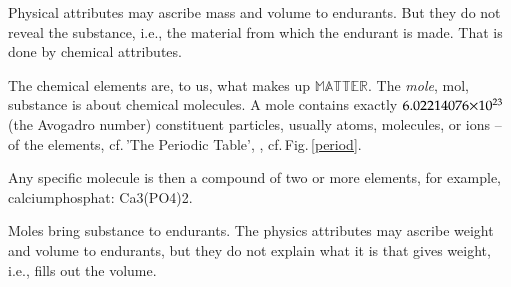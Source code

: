 \pos{\psno}{\mnewfoil}

\noindent
\treprikker
\begynd
\pind Physical attributes may ascribe mass and volume to endurants.
\begynd
\pind But they do not reveal the substance,
\pind i.e., the material from which the endurant is made.
\pind That is done by chemical attributes.
\afslut
\afslut

\begynd
\pind The chemical elements are, to us, what makes up 
      $\mathbb{MATTER}$.
\pind The \textsl{mole}, \textsf{mol}, substance is about chemical
molecules. 
\begynd
\pind A \textsf{mole} contains exactly $6.022\-14\-076{\times}10^{23}$
(the Avogadro 
      number) constituent particles, usually
      atoms, molecules, or ions -- of the elements,
\pind cf.\,\textsf{'The Periodic Table',} 
      ,
      \nyl cf.\,Fig.\,\ref{period}.
\afslut
\afslut
\mnewfoil
{}
\LLLL

\noindent%
\begynd
\pind Any specific molecule is then a compound of two or more elements,
      \nyl for example, \textsf{cal\-ci\-um\-phos\-phat: Ca3(PO4)2}.
\afslut

\mnewfoil%
\begynd%
\pind Moles bring substance to endurants.
\begynd
\pind The physics attributes may ascribe weight and volume
      to endurants,
\pind but they do not explain what it is that gives weight, \nyl
      i.e., fills out the volume.
\afslut
\afslut

\label{si.n}
